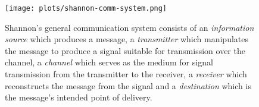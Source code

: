 \begin{figure}
\centering
\texttt{[image: plots/shannon-comm-system.png]}
\caption[Shannon's general communication system.]{\label{fig:shannon-comm-system}Shannon's general communication system consists of
an \textit{information source} which produces a message,
a \textit{transmitter} which manipulates the message to produce a signal suitable for transmission over the channel,
a \textit{channel} which serves as the medium for signal transmission from the transmitter to the receiver,
a \textit{receiver} which reconstructs the message from the signal and
a \textit{destination} which is the message's intended point of delivery\protect\footnotemark[2].}
\end{figure}
